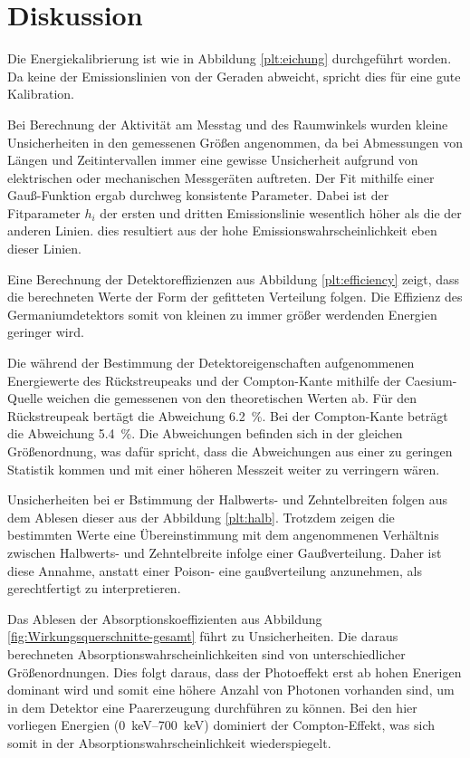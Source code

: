 \section{Diskussion}
\label{sec:Diskussion}
Die Energiekalibrierung ist wie in Abbildung \ref{plt:eichung} durchgeführt worden.
Da keine der Emissionslinien von der Geraden abweicht, spricht dies für eine gute
Kalibration.

Bei Berechnung der Aktivität am Messtag und des Raumwinkels wurden kleine Unsicherheiten
in den gemessenen Größen angenommen, da bei Abmessungen von Längen und Zeitintervallen
immer eine gewisse Unsicherheit aufgrund von elektrischen oder mechanischen Messgeräten
auftreten.
Der Fit mithilfe einer Gauß-Funktion ergab durchweg konsistente Parameter. Dabei
ist der Fitparameter $h_i$ der ersten und dritten Emissionslinie wesentlich höher
als die der anderen Linien. dies resultiert aus der hohe Emissionswahrscheinlichkeit
eben dieser Linien.

Eine Berechnung der Detektoreffizienzen aus Abbildung \ref{plt:efficiency} zeigt,
dass die berechneten Werte der Form der gefitteten Verteilung folgen. Die Effizienz
des Germaniumdetektors somit von kleinen zu immer größer werdenden Energien geringer
wird.

Die während der Bestimmung der Detektoreigenschaften aufgenommenen Energiewerte des
Rückstreupeaks und der Compton-Kante mithilfe der Caesium-Quelle weichen die gemessenen
von den theoretischen Werten ab. Für den
Rückstreupeak bertägt die Abweichung \SI{6.2}{\percent}. Bei der Compton-Kante beträgt
die Abweichung \SI{5.4}{\percent}. Die Abweichungen befinden sich in der gleichen
Größenordnung, was dafür spricht, dass die Abweichungen aus einer zu geringen Statistik
kommen und mit einer höheren Messzeit weiter zu verringern wären.

Unsicherheiten bei er Bstimmung der Halbwerts- und Zehntelbreiten folgen aus dem
Ablesen dieser aus der Abbildung \ref{plt:halb}. Trotzdem zeigen die bestimmten Werte
eine Übereinstimmung mit dem angenommenen Verhältnis zwischen Halbwerts- und
Zehntelbreite infolge einer Gaußverteilung. Daher ist diese Annahme, anstatt einer Poison-
eine gaußverteilung anzunehmen, als gerechtfertigt zu interpretieren.

Das Ablesen der Absorptionskoeffizienten aus Abbildung \ref{fig:Wirkungsquerschnitte-gesamt}
führt zu Unsicherheiten. Die daraus berechneten Absorptionswahrscheinlichkeiten
sind von unterschiedlicher Größenordnungen. Dies folgt daraus, dass der Photoeffekt
erst ab hohen Enerigen dominant wird und somit eine höhere Anzahl von Photonen vorhanden
sind, um in dem Detektor eine Paarerzeugung durchführen zu können. Bei den hier
vorliegen Energien (\SIrange{0}{700}{\kilo\electronvolt}) dominiert der Compton-Effekt,
was sich somit in der Absorptionswahrscheinlichkeit wiederspiegelt.

